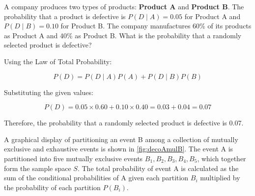 \begin{example}
    A company produces two types of products: \textbf{Product A} and \textbf{Product B}. The probability that a product is defective is \( P(D \mid A) = 0.05 \) for Product A and \( P(D \mid B) = 0.10 \) for Product B. The company manufactures 60\% of its products as Product A and 40\% as Product B. What is the probability that a randomly selected product is defective?
\end{example}

\begin{solution}
    Using the Law of Total Probability:

    \[
    P(D) = P(D \mid A) P(A) + P(D \mid B) P(B)
    \]

    Substituting the given values:

    \[
    P(D) = 0.05 \times 0.60 + 0.10 \times 0.40 = 0.03 + 0.04 = 0.07
    \]

    Therefore, the probability that a randomly selected product is defective is 0.07.
\end{solution}

A graphical display of partitioning an event B
among a collection of mutually exclusive and exhaustive events is shown in \autoref{fig:decoAmulB}. The event A is partitioned into five mutually exclusive events \( B_1, B_2, B_3, B_4, B_5 \), which together form the sample space \( S \). The total probability of event A is calculated as the sum of the conditional probabilities of A given each partition \( B_i \) multiplied by the probability of each partition \( P(B_i) \).

